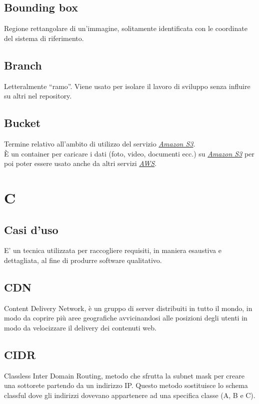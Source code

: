 \documentclass{classes/base}
\begin{document}
        \subsection*{Bounding box}
        Regione rettangolare di un'immagine, solitamente identificata con le coordinate del sistema di riferimento.

        \subsection*{Branch} 
        Letteralmente “ramo”. Viene usato per isolare il lavoro di sviluppo senza influire su altri nel repository. 
        
        \subsection*{Bucket}
        Termine relativo all'ambito di utilizzo del servizio \hyperref[sec:S3]{\emph{Amazon S3}}.\\
        È un container per caricare i dati (foto, video, documenti ecc.) su \hyperref[sec:S3]{\emph{Amazon S3}} per poi poter essere usato anche da altri servizi \hyperref[sec:AWS]{\emph{AWS}}. 
        
        \newpage  
    \section{C}
        \subsection*{Casi d'uso} 
        E' un tecnica utilizzata per raccogliere requisiti, in maniera esaustiva e dettagliata, al fine di produrre software qualitativo.

        \subsection*{CDN}
        Content Delivery Network, è un gruppo di server distribuiti in tutto il mondo, in modo da coprire più aree geografiche avvicinandosi alle posizioni degli utenti in modo da velocizzare il delivery dei contenuti web.
    
        \subsection*{CIDR}
        Classless Inter Domain Routing, metodo che sfrutta la subnet mask per creare una sottorete partendo da un indirizzo IP.  Questo metodo sostituisce lo schema classful dove gli indirizzi dovevano appartenere ad una specifica classe (A, B e C).
    
\end{document}
